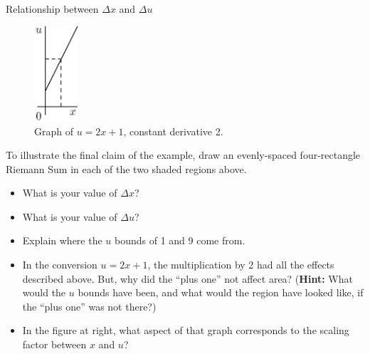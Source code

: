 \begin{exercise}{Relationship between $\Delta x$ and $\Delta u$ \Coffeecup }

\begin{figure}
  \centering
  \includegraphics[height=100pt]{ChapterAntidiff/Figures/utox.eps}
  \caption*{Graph of $u=2x+1$, constant derivative 2.}
\end{figure}
To illustrate the final claim of the example, draw an evenly-spaced four-rectangle Riemann Sum in each of the two shaded regions above.

\begin{itemize}
\item What is your value of $\Delta x$?

\item What is your value of $\Delta u$?

\item Explain where the $u$ bounds of 1 and 9 come from.

\item In the conversion $u=2x+1$, the multiplication by 2 had all the effects described above.  But, why did the ``plus one'' not affect area?  ({\bf Hint:} What would the $u$ bounds have been, and what would the region have looked like, if the ``plus one'' was not there?)

\item In the figure at right, what aspect of that graph corresponds to the scaling factor between $x$ and $u$?


\end{itemize}
\end{exercise}
